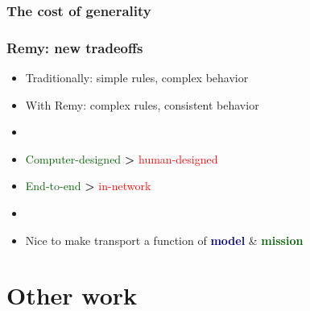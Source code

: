 \documentclass[svgnames]{beamer}
\begin{document}
\begin{frame}
\frametitle{The cost of generality}

\begin{centering}

\noindent {}

\end{centering}

\end{frame}

\begin{frame}
\frametitle{Remy: new tradeoffs}

\large

\begin{itemize}

\item Traditionally: simple rules, complex behavior

\item With Remy: complex rules, consistent behavior

\item[]

\item \textcolor{DarkGreen}{Computer-designed} {\LARGE \textbf{\textgreater}} \textcolor{Red}{human-designed}

\item \textcolor{DarkGreen}{End-to-end} {\LARGE \textbf{\textgreater}} \textcolor{Red}{in-network}

\item[]

\item Nice to make transport a function of \textbf{\textcolor{DarkBlue}{model}} \& \textbf{\textcolor{DarkGreen}{mission}}

\end{itemize}

\end{frame}

%
%
%
%
%
%
%
%
%
%

\section{Other work}

\end{document}
